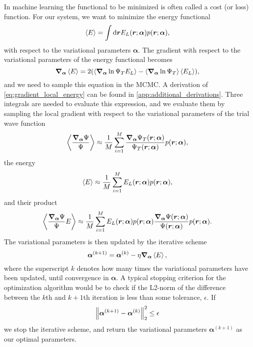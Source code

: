 In machine learning the functional to be minimized is often called a cost (or loss) function. For our system, we want to minimize the energy functional
\begin{equation}
    \expval{E} = \int\mathrm{d}\bm{r}E_L(\bm{r};\bm{\alpha})p(\bm{r};\bm{\alpha}),  
\end{equation}
with respect to the variational parameters $\bm{\alpha}$. The gradient with respect to the variational parameters of the energy functional becomes
\begin{equation}\label{eq:gradient_local_energy}
    \grad_{\bm{\alpha}}\expval{E} = 2\qty(\expval{\grad_{\mathrm{\bm{\alpha}}}\ln{\Psi_T}E_L} - \expval{\grad_{\mathrm{\bm{\alpha}}}\ln{\Psi_T}}\expval{E_L}), 
\end{equation}
and we need to sample this equation in the MCMC. A derivation of \autoref{eq:gradient_local_energy} can be found in \cref{app:additional_derivations}. Three integrals are needed to evaluate this expression, and we evaluate them by sampling the local gradient with respect to the variational parameters of the trial wave function 
\begin{equation}
    \expval{\frac{\grad_{\bm{\alpha}}\Psi}{\Psi}} \approx \frac{1}{M}\sum_{i=1}^M\frac{\grad_{\bm{\alpha}}\Psi_T(\bm{r};\bm{\alpha})}{\Psi_T(\bm{r};\bm{\alpha})}p(\bm{r};\bm{\alpha}), 
\end{equation}
the energy
\begin{equation}
    \expval{E} \approx \frac{1}{M}\sum_{i=1}^ME_L(\bm{r};\bm{\alpha})p(\bm{r};\bm{\alpha}), 
\end{equation}
and their product
\begin{equation}
    \expval{\frac{\grad_{\bm{\alpha}}\Psi}{\Psi}E} \approx \frac{1}{M}\sum_{i=1}^M E_L(\bm{r};\bm{\alpha})p(\bm{r};\bm{\alpha})\frac{\grad_{\bm{\alpha}}\Psi(\bm{r};\bm{\alpha})}{\Psi(\bm{r};\bm{\alpha})}p(\bm{r};\bm{\alpha}).
\end{equation}
The variational parameters is then updated by the iterative scheme 
\begin{equation}
    \bm{\alpha}^{(k+1)} = \bm{\alpha}^{(k)} - \eta\grad_{\bm{\alpha}}\expval{E}, 
\end{equation}
where the superscript $k$ denotes how many times the variational parameters have been updated, until convergence in $\bm{\alpha}$. A typical stopping criterion for the optimization algorithm would be to check if the L2-norm of the difference between the $k$th and $k+1$th iteration is less than some tolerance, $\epsilon$. If
\begin{equation}
    \norm{\bm{\alpha}^{(k+1)}-\bm{\alpha}^{(k)}}_2^2 \leq \epsilon 
\end{equation}
we stop the iterative scheme, and return the variational parameters $\bm{\alpha}^{(k+1)}$ as our optimal parameters.

